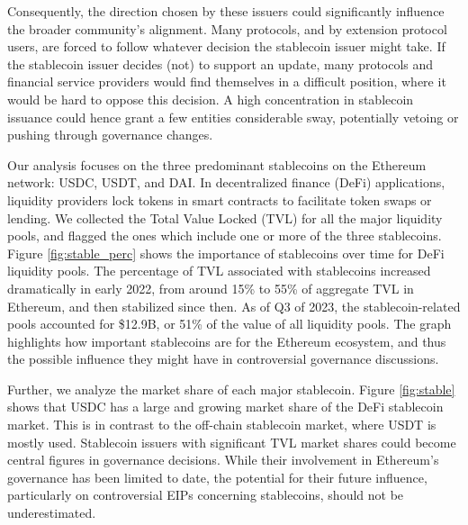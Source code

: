 \documentclass[No]{AEA}
\begin{document}
Consequently, the direction chosen by these issuers could significantly influence the broader community's alignment. Many protocols, and by extension protocol users, are forced to follow whatever decision the stablecoin issuer might take. If the stablecoin issuer decides (not) to support an update, many protocols and financial service providers would find themselves in a difficult position, where it would be hard to oppose this decision. A high concentration in stablecoin issuance could hence grant a few entities considerable sway, potentially vetoing or pushing through governance changes.

Our analysis focuses on the three predominant stablecoins on the Ethereum network: USDC, USDT, and DAI. In decentralized finance (DeFi) applications, liquidity providers lock tokens in smart contracts to facilitate token swaps or lending. We collected the Total Value Locked (TVL) for all the major liquidity pools, and flagged the ones which include one or more of the three stablecoins. Figure \ref{fig:stable_perc} shows the importance of stablecoins over time for DeFi liquidity pools. The percentage of TVL associated with stablecoins increased dramatically in early 2022, from around 15\% to 55\% of aggregate TVL in Ethereum, and then stabilized since then. As of Q3 of 2023, the stablecoin-related pools accounted for \$12.9B, or 51\% of the value of all liquidity pools. The graph highlights how important stablecoins are for the Ethereum ecosystem, and thus the possible influence they might have in controversial governance discussions. 

Further, we analyze the market share of each major stablecoin. Figure \ref{fig:stable} shows that USDC has a large and growing market share of the DeFi stablecoin market. This is in contrast to the off-chain stablecoin market, where USDT is mostly used. Stablecoin issuers with significant TVL market shares could become central figures in governance decisions. While their involvement in Ethereum's governance has been limited to date, the potential for their future influence, particularly on controversial EIPs concerning stablecoins, should not be underestimated.
\end{document}
